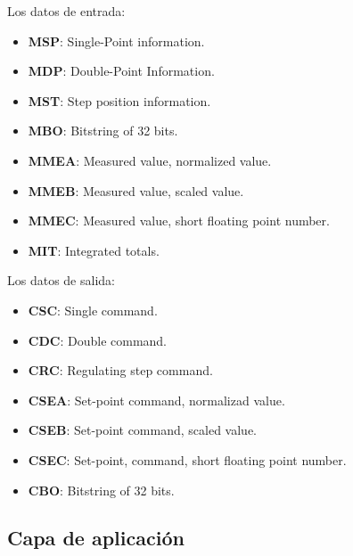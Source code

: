 \documentclass[a5paper]{book}%
\begin{document}
Los datos de entrada:

\begin{itemize}
	\item \textbf{MSP}: Single-Point information.
	\item \textbf{MDP}: Double-Point Information.
	\item \textbf{MST}: Step position information.
	\item \textbf{MBO}: Bitstring of 32 bits.
	\item \textbf{MMEA}: Measured value, normalized value.
	\item \textbf{MMEB}: Measured value, scaled value.
	\item \textbf{MMEC}: Measured value, short floating point number.
	\item \textbf{MIT}: Integrated totals.
\end{itemize}

Los datos de salida:

\begin{itemize}
	\item \textbf{CSC}: Single command.
	\item \textbf{CDC}: Double command.
	\item \textbf{CRC}: Regulating step command.
	\item \textbf{CSEA}: Set-point command, normalizad value.
	\item \textbf{CSEB}: Set-point command, scaled value.
	\item \textbf{CSEC}: Set-point, command, short floating point number.
	\item \textbf{CBO}: Bitstring of 32 bits.
\end{itemize}

\subsection*{Capa de aplicación}
\end{document}
